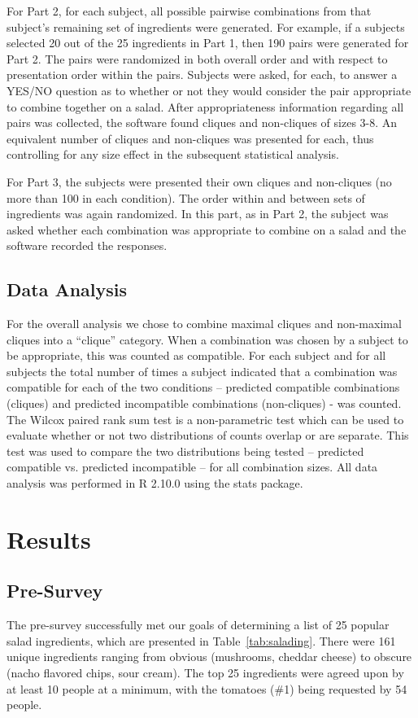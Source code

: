 For Part 2, for each subject, all possible pairwise combinations from that subject’s remaining set of ingredients were generated.  For example, if a subjects selected 20 out of the 25 ingredients in Part 1, then 190 pairs were generated for Part 2.  The pairs were randomized in both overall order and with respect to presentation order within the pairs.  Subjects were asked, for each, to answer a YES/NO question as to whether or not they would consider the pair appropriate to combine together on a salad.  After appropriateness information regarding all pairs was collected, the software found cliques and non-cliques of sizes 3-8.  An equivalent number of cliques and non-cliques was presented for each, thus controlling for any size effect in the subsequent statistical analysis.  

For Part 3, the subjects were presented their own cliques and non-cliques (no more than 100 in each condition).  The order within and between sets of ingredients was again randomized.  In this part, as in Part 2, the subject was asked whether each combination was appropriate to combine on a salad and the software recorded the responses.  

\subsection{Data Analysis}
For the overall analysis we chose to combine maximal cliques and non-maximal cliques into a “clique” category.  When a combination was chosen by a subject to be appropriate, this was counted as compatible.  For each subject and for all subjects the total number of times a subject indicated that a combination was compatible for each of the two conditions – predicted compatible combinations (cliques) and predicted incompatible combinations (non-cliques)  - was counted.  The Wilcox paired rank sum test is a non-parametric test which can be used to evaluate whether or not two distributions of counts overlap or are separate.  This test was used to compare the two distributions being tested – predicted compatible vs. predicted incompatible – for all combination sizes.  All data analysis was performed in R 2.10.0 using the stats package.  

\section{Results}
\subsection{Pre-Survey}
The pre-survey successfully met our goals of determining a list of 25 popular salad ingredients, which are presented in Table~\ref{tab:salading}.  There were 161 unique ingredients ranging from obvious (mushrooms, cheddar cheese) to obscure (nacho flavored chips, sour cream).  The top 25 ingredients were agreed upon by at least 10 people at a minimum, with the tomatoes (\#1) being requested by 54 people.  

